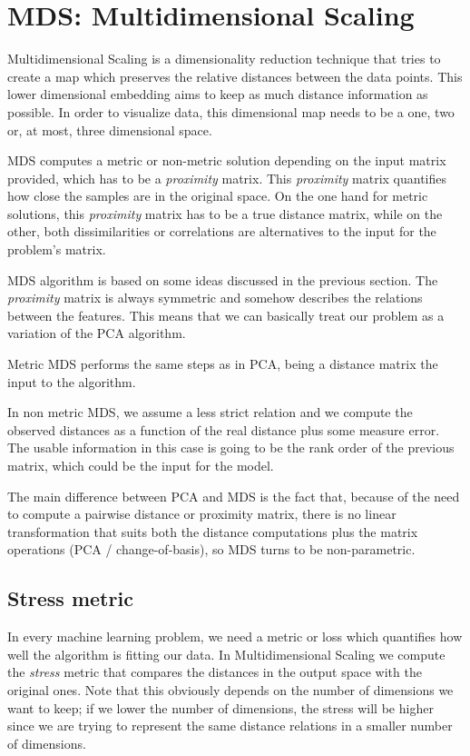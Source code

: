 \documentclass[a4paper,11pt,spanish]{report}
\begin{document}
\section{MDS: Multidimensional Scaling}
\label{sec:mds}

Multidimensional Scaling \citep{mds} is a dimensionality reduction technique that tries to create a map which preserves the relative distances between the data points. This lower dimensional embedding aims to keep as much distance information as possible. In order to visualize data, this dimensional map needs to be a one, two or, at most, three dimensional space.

MDS computes a metric or non-metric solution depending on the input matrix provided, which has to be a \textit{proximity} matrix. This \textit{proximity} matrix quantifies how close the samples are in the original space. On the one hand for metric solutions, this \textit{proximity} matrix has to be a true distance matrix, while on the other, both dissimilarities or correlations are alternatives to the input for the problem's matrix.

MDS algorithm is based on some ideas discussed in the previous section. The \textit{proximity} matrix is always  symmetric and somehow describes the relations between the features. This means that we can basically treat our problem as a variation of the PCA algorithm.

Metric MDS performs the same steps as in PCA, being a distance matrix the input to the algorithm.

In non metric MDS, we assume a less strict relation and we compute the observed distances as a function of the real distance plus some measure error. The usable information in this case is going to be the rank order of the previous matrix, which could be the input for the model.

The main difference between PCA and MDS is the fact that, because of the need to compute a pairwise distance or proximity matrix, there is no linear transformation that suits both the distance computations plus the matrix operations (PCA / change-of-basis), so MDS turns to be non-parametric.

\subsection{Stress metric}
\label{ssec:str}

In every machine learning problem, we need a metric or loss which quantifies how well the algorithm is fitting our data. In Multidimensional Scaling we compute the \textit{stress} metric that compares the distances in the output space with the original ones. Note that this obviously depends on the number of dimensions we want to keep; if we lower the number of dimensions, the stress will be higher since we are trying to represent the same distance relations in a smaller number of dimensions.
\end{document}
